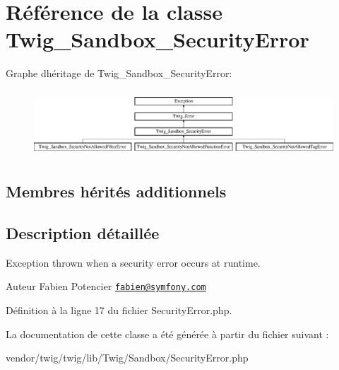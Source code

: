 \hypertarget{class_twig___sandbox___security_error}{}\section{Référence de la classe Twig\+\_\+\+Sandbox\+\_\+\+Security\+Error}
\label{class_twig___sandbox___security_error}
Graphe d\textquotesingle{}héritage de Twig\+\_\+\+Sandbox\+\_\+\+Security\+Error\+:\begin{figure}[H]
\begin{center}
\leavevmode
\includegraphics[height=2.497213cm]{class_twig___sandbox___security_error}
\end{center}
\end{figure}
\subsection*{Membres hérités additionnels}


\subsection{Description détaillée}
Exception thrown when a security error occurs at runtime.

\begin{DoxyAuthor}{Auteur}
Fabien Potencier \href{mailto:fabien@symfony.com}{\tt fabien@symfony.\+com} 
\end{DoxyAuthor}


Définition à la ligne 17 du fichier Security\+Error.\+php.



La documentation de cette classe a été générée à partir du fichier suivant \+:\begin{DoxyCompactItemize}
\item 
vendor/twig/twig/lib/\+Twig/\+Sandbox/Security\+Error.\+php\end{DoxyCompactItemize}
